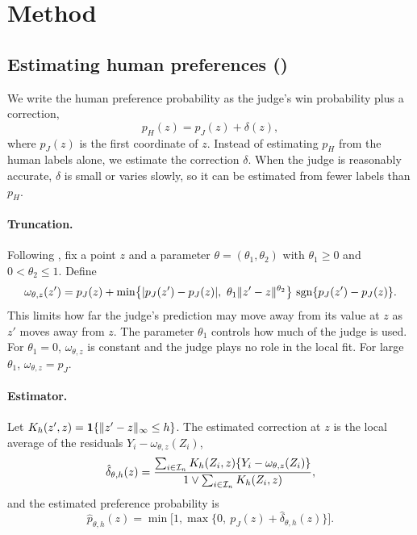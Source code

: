 \section{Method}
\label{sec:method}

\subsection{Estimating human preferences (\dfsp)}
\label{sec:dfsp}

We write the human preference probability as the judge's win probability plus a correction,
\[
  p_H(z)=p_J(z)+\delta(z),
\]
where $p_J(z)$ is the first coordinate of $z$. Instead of estimating $p_H$ from the human labels
alone, we estimate the correction $\delta$. When the judge is reasonably accurate, $\delta$ is small
or varies slowly, so it can be estimated from fewer labels than $p_H$.

\paragraph{Truncation.}
Following \citet{li2026personalizing}, fix a point $z$ and a parameter $\theta=(\theta_1,\theta_2)$
with $\theta_1\ge0$ and $0<\theta_2\le1$. Define
\[
  \omega_{\theta,z}(z')=p_J(z)+\min\bigl\{|p_J(z')-p_J(z)|,\ \theta_1\norm{z'-z}^{\theta_2}\bigr\}\,
  \operatorname{sgn}\{p_J(z')-p_J(z)\}.
\]
This limits how far the judge's prediction may move away from its value at $z$ as $z'$ moves away
from $z$. The parameter $\theta_1$ controls how much of the judge is used. For $\theta_1=0$,
$\omega_{\theta,z}$ is constant and the judge plays no role in the local fit. For large $\theta_1$,
$\omega_{\theta,z}=p_J$.

\paragraph{Estimator.}
Let $K_h(z',z)=\mathbf{1}\{\lVert z'-z \rVert_\infty\le h\}$. The estimated correction at $z$ is the local average
of the residuals $Y_i-\omega_{\theta,z}(Z_i)$,
\[
  \hat\delta_{\theta,h}(z)=\frac{\sum_{i\in\mathcal{I}_n}K_h(Z_i,z)\{Y_i-\omega_{\theta,z}(Z_i)\}}
                                 {1\vee\sum_{i\in\mathcal{I}_n}K_h(Z_i,z)},
\]
and the estimated preference probability is
\[
  \hat p_{\theta,h}(z)=\min\bigl[1,\max\{0,\ p_J(z)+\hat\delta_{\theta,h}(z)\}\bigr].
\]

